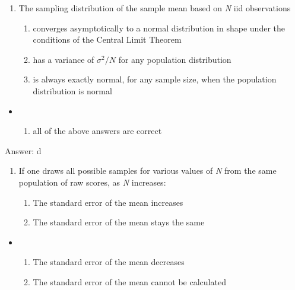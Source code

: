 \documentclass[]{article}
\providecommand{\tightlist}{%
  \setlength{\itemsep}{0pt}\setlength{\parskip}{0pt}}
\begin{document}
\begin{enumerate}
\def\labelenumi{\arabic{enumi}.}
\setcounter{enumi}{8}
\item
  The sampling distribution of the sample mean based on \emph{N} iid
  observations

  \begin{enumerate}
  \def\labelenumii{\alph{enumii}.}
  \tightlist
  \item
    converges asymptotically to a normal distribution in shape under the
    conditions of the Central Limit Theorem
  \item
    has a variance of \(\sigma^2/N\) for any population distribution
  \item
    is always exactly normal, for any sample size, when the population
    distribution is normal
  \end{enumerate}
\end{enumerate}

\begin{itemize}
\item
  \begin{enumerate}
  \def\labelenumi{\alph{enumi}.}
  \setcounter{enumi}{3}
  \tightlist
  \item
    all of the above answers are correct
  \end{enumerate}
\end{itemize}

Answer: d

\begin{enumerate}
\def\labelenumi{\arabic{enumi}.}
\setcounter{enumi}{9}
\item
  If one draws all possible samples for various values of \emph{N} from
  the same population of raw scores, as \emph{N} increases:

  \begin{enumerate}
  \def\labelenumii{\alph{enumii}.}
  \tightlist
  \item
    The standard error of the mean increases
  \item
    The standard error of the mean stays the same
  \end{enumerate}
\end{enumerate}

\begin{itemize}
\item
  \begin{enumerate}
  \def\labelenumi{\alph{enumi}.}
  \setcounter{enumi}{2}
  \tightlist
  \item
    The standard error of the mean decreases
  \item
    The standard error of the mean cannot be calculated
  \end{enumerate}
\end{itemize}
\end{document}
